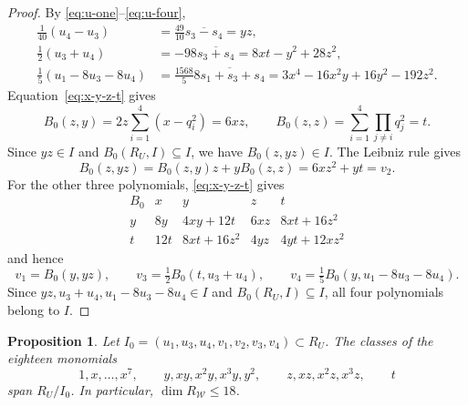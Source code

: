 \documentclass[11pt]{amsart}
\numberwithin{equation}{section}
\newtheorem{proposition}[theorem]{Proposition}
\theoremstyle{definition}
\theoremstyle{remark}
\begin{document}
\begin{proof}
By \eqref{eq:u-one}--\eqref{eq:u-four},
\[
\begin{aligned}
 \tfrac1{40}(u_4-u_3)
  &=\tfrac{49}{10}\overline{s_3-s_4}=yz,\\
 \tfrac12(u_3+u_4)
  &=-98\overline{s_3+s_4}=8xt-y^2+28z^2,\\
 \tfrac15(u_1-8u_3-8u_4)
  &=\tfrac{1568}{5}\overline{8s_1+s_3+s_4}
    =3x^4-16x^2y+16y^2-192z^2.
\end{aligned}
\]
Equation~\eqref{eq:x-y-z-t} gives
\[
 B_0(z,y)=2z\sum_{i=1}^4(x-q_i^2)=6xz,\qquad
 B_0(z,z)=\sum_{i=1}^4\prod_{j\ne i}q_j^2=t.
\]
Since $yz \in I$ and $B_0(R_U,I)\subseteq I$, we have
$B_0(z,yz)\in I$. The Leibniz rule gives
\[
 B_0(z,yz)=B_0(z,y)z+yB_0(z,z)=6xz^2+yt=v_2.
\]
For the other three polynomials, \eqref{eq:x-y-z-t} gives
\[
\begin{array}{c|cccc}
 B_0 & x & y & z & t\\ \hline
 y & 8y & 4xy+12t & 6xz & 8xt+16z^2\\
 t & 12t & 8xt+16z^2 & 4yz & 4yt+12xz^2
\end{array}
\]
and hence
\[
 v_1=B_0(y,yz),\qquad
 v_3=\tfrac12 B_0(t,u_3+u_4),\qquad
 v_4=\tfrac15 B_0(y,u_1-8u_3-8u_4).
\]
Since $yz,u_3+u_4,u_1-8u_3-8u_4\in I$ and $B_0(R_U,I)\subseteq I$,
all four polynomials belong to $I$.
\end{proof}

\begin{proposition}\label{prop:dim-RW-kvocijent}
Let $I_0=(u_1,u_3,u_4,v_1,v_2,v_3,v_4)\subset R_U$.
The classes of the eighteen monomials
\[
 1,x,\ldots,x^7,\qquad
 y,xy,x^2y,x^3y,y^2,\qquad
 z,xz,x^2z,x^3z,\qquad t
\]
span $R_U/I_0$. In particular, $\dim R_{\mathcal W}\leq18$.
\end{proposition}
\end{document}
